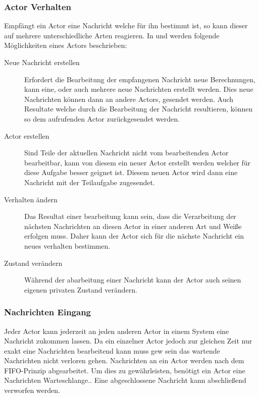 \subsubsection{Actor Verhalten}
\label{actorBehaviour}
Empfängt ein Actor eine Nachricht welche für ihn bestimmt ist, so kann dieser auf mehrere unterschiedliche Arten reagieren. In \citep{Agha1985ActorsSystems} und \citep{Vernon2015ReactiveAkka} werden folgende Möglichkeiten eines Actors beschrieben:
\begin{description}
    \item[Neue Nachricht erstellen] Erfordert die Bearbeitung der empfangenen Nachricht neue Berechnungen, kann eine, oder auch mehrere neue Nachrichten erstellt werden. Dies neue Nachrichten können dann an andere Actors, gesendet werden. Auch Resultate welche durch die Bearbeitung der Nachricht resultieren, können so dem aufrufenden Actor zurückgesendet werden.
    \item[Actor erstellen] Sind Teile der aktuellen Nachricht nicht vom bearbeitenden Actor bearbeitbar, kann von diesem ein neuer Actor erstellt werden welcher für diese Aufgabe besser geignet ist. Diesem neuen Actor wird dann eine Nachricht mit der Teilaufgabe zugesendet.
    \item[Verhalten ändern] Das Resultat einer bearbeitung kann sein, dass die Verarbeitung der nächsten Nachrichten an diesen Actor in einer anderen Art und Weiße erfolgen muss. Daher kann der Actor sich für die nächste Nachricht ein neues verhalten bestimmen.
    \item[Zustand verändern] Während der abarbeitung einer Nachricht kann der Actor auch seinen eigenen privaten Zustand verändern.
\end{description}

\subsubsection{Nachrichten Eingang}\label{actor:Mailbox}
Jeder Actor kann jederzeit an jeden anderen Actor in einem System eine Nachricht zukommen lassen. Da ein einzelner Actor jedoch zur gleichen Zeit nur exakt eine Nachrichten bearbeitend kann muss gew sein das wartende Nachrichten nicht verloren gehen. Nachrichten an ein Actor werden nach dem {FIFO-Prinzip} abgearbeitet. 
 Um dies zu gewährleisten, benötigt ein Actor eine Nachrichten Warteschlange.\citep{Agha1985ActorsSystems}. Eine abgeschlossene Nachricht kann abschließend verworfen werden. 

